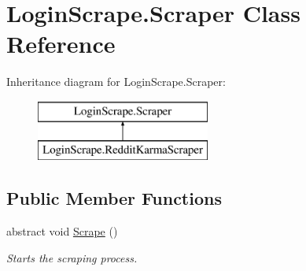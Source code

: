 \hypertarget{class_login_scrape_1_1_scraper}{}\section{Login\+Scrape.\+Scraper Class Reference}
\label{class_login_scrape_1_1_scraper}
Inheritance diagram for Login\+Scrape.\+Scraper\+:\begin{figure}[H]
\begin{center}
\leavevmode
\includegraphics[height=2.000000cm]{class_login_scrape_1_1_scraper}
\end{center}
\end{figure}
\subsection*{Public Member Functions}
\begin{DoxyCompactItemize}
\item 
abstract void \hyperlink{class_login_scrape_1_1_scraper_a39769c81c7b10937f7434bc37967f1ac}{Scrape} ()
\begin{DoxyCompactList}\small\item\em Starts the scraping process. \end{DoxyCompactList}\end{DoxyCompactItemize}
